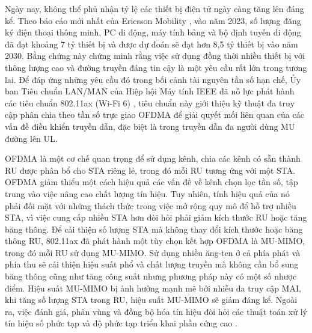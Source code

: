 Ngày nay, không thể phủ nhận tỷ lệ các thiết bị điện tử ngày càng tăng lên đáng kể. Theo báo cáo mới nhất của Ericsson Mobility \cite{Ericsson}, vào năm 2023, số lượng đăng ký điện thoại thông minh, PC di động, máy tính bảng và bộ định tuyến di động đã đạt khoảng 7 tỷ thiết bị và được dự đoán sẽ đạt hơn 8,5 tỷ thiết bị vào năm 2030.
Bằng chứng này chứng minh rằng việc sử dụng đồng thời nhiều thiết bị với thông lượng cao và đường truyền đáng tin cậy là một yêu cầu rất lớn trong tương lai. Để đáp ứng những yêu cầu đó trong bối cảnh tài nguyên tần số hạn chế, Ủy ban Tiêu chuẩn LAN/MAN của Hiệp hội Máy tính IEEE đã nỗ lực phát hành các tiêu chuẩn 802.11ax (Wi-Fi 6) \cite{IEEEStd}, tiêu chuẩn này giới thiệu kỹ thuật đa truy cập phân chia theo tần số trực giao \acrshort{OFDMA} để giải quyết mối liên quan của các vấn đề điều khiển truyền dẫn, đặc biệt là trong truyền dẫn đa người dùng \acrshort{MU} đường lên \acrshort{UL}.

 
\acrshort{OFDMA} là một cơ chế quan trọng để sử dụng kênh, chia các kênh có sẵn thành \acrfull{RU} được phân bổ cho \acrshort{STA} riêng lẻ, trong đó mỗi \acrshort{RU} tương ứng với một \acrshort{STA}. OFDMA giảm thiểu một cách hiệu quả các vấn đề về kênh chọn lọc tần số, tập trung vào việc nâng cao chất lượng tín hiệu. Tuy nhiên, tính hiệu quả của nó phải đối mặt với những thách thức trong việc mở rộng quy mô để hỗ trợ nhiều STA, vì việc cung cấp nhiều STA hơn đòi hỏi phải giảm kích thước RU hoặc tăng băng thông.
Để cải thiện số lượng STA mà không thay đổi kích thước hoặc băng thông RU, 802.11ax đã phát hành một tùy chọn kết hợp OFDMA là \acrfull{MU-MIMO}, trong đó mỗi RU sử dụng MU-MIMO. Sử dụng nhiều ăng-ten ở cả phía phát và phía thu sẽ cải thiện hiệu suất phổ và chất lượng truyền mà không cần bổ sung băng thông cũng như tăng công suất nhưng phương pháp này có một số nhược điểm.
Hiệu suất MU-MIMO bị ảnh hưởng mạnh mẽ bởi nhiễu đa truy cập \acrfull{MAI}, khi tăng số lượng STA trong RU, hiệu suất MU-MIMO sẽ giảm đáng kể.
Ngoài ra, việc đánh giá, phân vùng và đồng bộ hóa tín hiệu đòi hỏi các thuật toán xử lý tín hiệu số phức tạp và độ phức tạp triển khai phần cứng cao \cite{MIMO_complex}.

